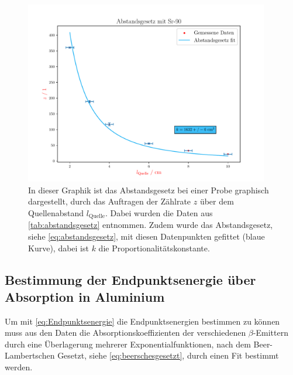 \documentclass[12pt,english,ngerman]{scrartcl}
\begin{document}
\begin{figure}[H]
  \begin{center}
    \includegraphics[width = 0.95\textwidth]{figures/abstandsgesetz.pdf}
  \end{center}
  \caption[Abstandsgesetz einer  Probe]{In dieser Graphik ist
    das Abstandsgesetz bei einer  Probe graphisch dargestellt,
    durch das Auftragen der Zählrate $z$ über dem Quellenabstand
    $l_{\mathrm{Quelle}}$. Dabei wurden die Daten aus
  \autoref{tab:abstandsgesetz} entnommen. Zudem wurde das Abstandsgesetz, siehe
\autoref{eq:abstandsgesetz}, mit diesen Datenpunkten gefittet (blaue Kurve),
dabei ist $k$ die Proportionalitätskonstante.}
  \label{fig:abstandsgesetz}
\end{figure}


\subsection{Bestimmung der Endpunktsenergie über Absorption in Aluminium}

Um mit \autoref{eq:Endpunktsenergie} die Endpunktsenergien bestimmen zu können
muss aus den Daten die Absorptionskoeffizienten der verschiedenen
$\beta$-Emittern durch eine Überlagerung mehrerer Exponentialfunktionen, nach
dem Beer-Lambertschen Gesetzt, siehe \autoref{eq:beerschesgesetzt}, durch einen
Fit bestimmt werden. 
\end{document}
